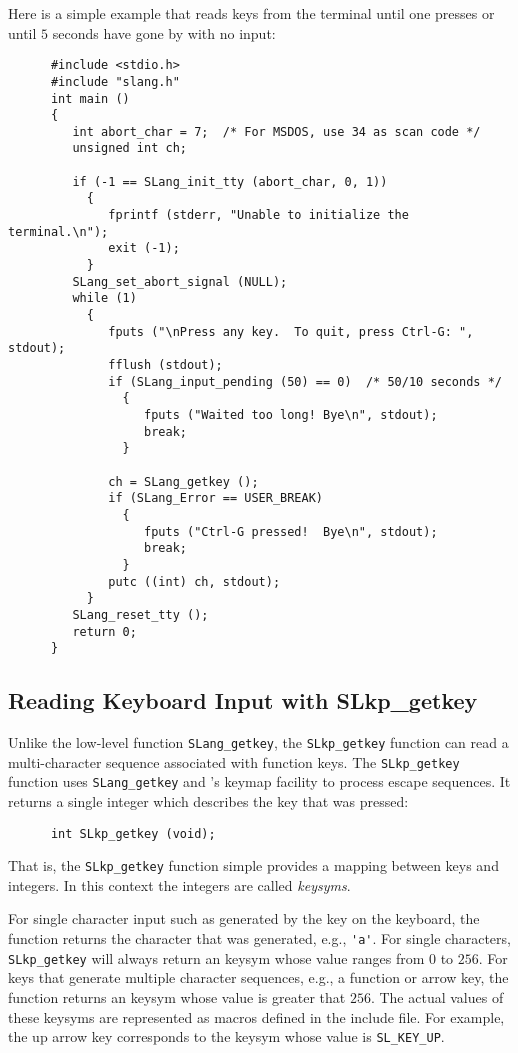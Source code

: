   Here is a simple example that reads keys from the terminal until one
  presses  or until $5$ seconds have gone by with no input:
\begin{verbatim} 
      #include <stdio.h>
      #include "slang.h"
      int main ()
      {
         int abort_char = 7;  /* For MSDOS, use 34 as scan code */
         unsigned int ch;
         
         if (-1 == SLang_init_tty (abort_char, 0, 1))
           {
              fprintf (stderr, "Unable to initialize the terminal.\n");
              exit (-1);
           }
         SLang_set_abort_signal (NULL);
         while (1)
           {
              fputs ("\nPress any key.  To quit, press Ctrl-G: ", stdout);
              fflush (stdout);
              if (SLang_input_pending (50) == 0)  /* 50/10 seconds */
                {
                   fputs ("Waited too long! Bye\n", stdout);
                   break;
                }
              
              ch = SLang_getkey ();
              if (SLang_Error == USER_BREAK)
                {
                   fputs ("Ctrl-G pressed!  Bye\n", stdout);
                   break;
                }
              putc ((int) ch, stdout);
           }
         SLang_reset_tty ();
         return 0;
      }
\end{verbatim} 



\subsection{Reading Keyboard Input with SLkp\_getkey} %

  Unlike the low-level function \verb|SLang_getkey|, the
  \verb|SLkp_getkey| function can read a multi-character sequence
  associated with function keys.  The \verb|SLkp_getkey| function uses
  \verb|SLang_getkey| and \slang's keymap facility to process escape
  sequences.  It returns a single integer which describes the key that
  was pressed:
\begin{verbatim} 
      int SLkp_getkey (void);
\end{verbatim}
  That is, the \verb|SLkp_getkey| function simple provides a mapping
  between keys and integers.  In this context the integers are called
  {\em keysyms}.
  
  For single character input such as generated by the  key on
  the keyboard, the function returns the character that was generated,
  e.g., \verb|'a'|.  For single characters, \verb|SLkp_getkey| will
  always return an keysym whose value ranges from $0$ to $256$. For
  keys that generate multiple character sequences, e.g., a function or
  arrow key, the function returns an keysym whose value is greater
  that $256$.  The actual values of these keysyms are represented as
  macros defined in the  include file.  For example, the
  up arrow key corresponds to the keysym whose value is
  \verb|SL_KEY_UP|. 
  
